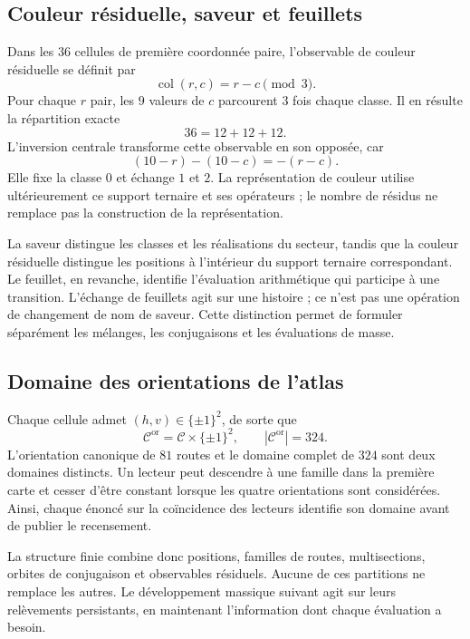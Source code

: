 \subsection{Couleur résiduelle, saveur et feuillets}

Dans les \(36\) cellules de première coordonnée paire, l’observable de couleur
résiduelle se définit par
\[
 \operatorname{col}(r,c)=r-c\pmod3.
\]
Pour chaque \(r\) pair, les \(9\) valeurs de \(c\) parcourent \(3\)
fois chaque classe. Il en résulte la répartition exacte
\[
 36=12+12+12.
\]
L’inversion centrale transforme cette observable en son opposée, car
\[
 (10-r)-(10-c)=-(r-c).
\]
Elle fixe la classe \(0\) et échange \(1\) et \(2\). La représentation
de couleur utilise ultérieurement ce support ternaire et ses opérateurs ;
le nombre de résidus ne remplace pas la construction de la représentation.

La saveur distingue les classes et les réalisations du secteur, tandis que la couleur
résiduelle distingue les positions à l’intérieur du support ternaire correspondant.
Le feuillet, en revanche, identifie l’évaluation arithmétique qui participe à
une transition. L’échange de feuillets agit sur une histoire ; ce n’est pas
une opération de changement de nom de saveur. Cette distinction permet de
formuler séparément les mélanges, les conjugaisons et les évaluations
de masse.

\subsection{Domaine des orientations de l'atlas}

Chaque cellule admet \((h,v)\in\{\pm1\}^2\), de sorte que
\[
 \mathcal C^{\mathrm{or}}=\mathcal C\times\{\pm1\}^2,
 \qquad |\mathcal C^{\mathrm{or}}|=324.
\]
L'orientation canonique de \(81\) routes et le domaine complet de \(324\)
sont deux domaines distincts. Un lecteur peut descendre à une famille dans la
première carte et cesser d'être constant lorsque les quatre
orientations sont considérées. Ainsi, chaque énoncé sur la coïncidence des lecteurs
identifie son domaine avant de publier le recensement.

La structure finie combine donc positions, familles de routes,
multisections, orbites de conjugaison et observables résiduels. Aucune
de ces partitions ne remplace les autres. Le développement massique suivant
agit sur leurs relèvements persistants, en maintenant l'information dont
chaque évaluation a besoin.
